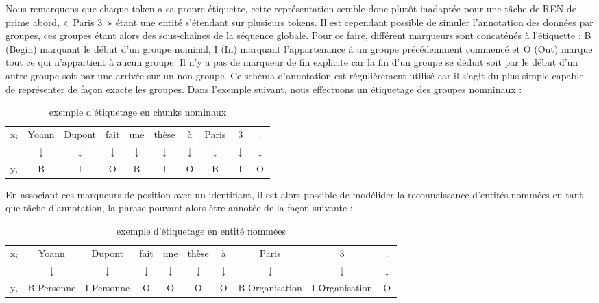 \documentclass[PhD-Yoann-Dupont.tex]{subfiles}
\begin{document}
Nous remarquons que chaque token a sa propre étiquette, cette représentation semble donc plutôt inadaptée pour une tâche de REN de prime abord, «\ Paris 3\ » étant une entité s'étendant sur plusieurs tokens. Il est cependant possible de simuler l'annotation des données par groupes, ces groupes étant alors des sous-chaînes de la séquence globale. Pour ce faire, différent marqueurs sont concaténés à l'étiquette : B (Begin) marquant le début d'un groupe nominal, I (In) marquant l'appartenance à un groupe précédemment commencé et O (Out) marque tout ce qui n'appartient à aucun groupe. Il n'y a pas de marqueur de fin explicite car la fin d'un groupe se déduit soit par le début d'un autre groupe soit par une arrivée sur un non-groupe. Ce schéma d'annotation est régulièrement utilisé car il s'agit du plus simple capable de représenter de façon exacte les groupes. Dans l'exemple suivant, nous effectuons un étiquetage des groupes nomninaux :

\begin{table}[ht!]
\centering
\begin{tabular}{lccccccccc}
x$_{i}$ & Yoann & Dupont & fait & une & thèse & à & Paris & 3 & . \\
        & $\downarrow$ & $\downarrow$ & $\downarrow$ & $\downarrow$ & $\downarrow$ & $\downarrow$ & $\downarrow$ & $\downarrow$ & $\downarrow$ \\
y$_{i}$ & B & I & O & B & I & O & B & I & O \\
\end{tabular}
\caption{exemple d'étiquetage en chunks nominaux}
\label{tab:NP-chunking-example}
\end{table}

En associant ces marqueurs de position avec un identifiant, il est alors possible de modélider la reconnaissance d'entités nommées en tant que tâche d'annotation, la phrase pouvant alors être annotée de la façon suivante :

\begin{table}[ht!]
\centering
\begin{tabular}{lccccccccc}
x$_{i}$ & Yoann & Dupont & fait & une & thèse & à & Paris & 3 & . \\
        & $\downarrow$ & $\downarrow$ & $\downarrow$ & $\downarrow$ & $\downarrow$ & $\downarrow$ & $\downarrow$ & $\downarrow$ & $\downarrow$ \\
y$_{i}$ & B-Personne & I-Personne & O & O & O & O & B-Organisation & I-Organisation & O \\
\end{tabular}
\caption{exemple d'étiquetage en entité nommées}
\label{tab:ner-example}
\end{table}
\end{document}
